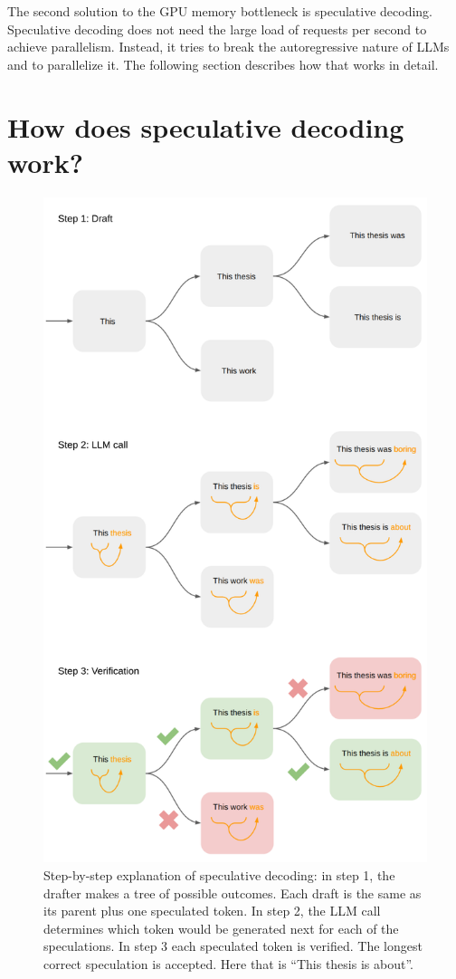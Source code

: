 The second solution to the GPU memory bottleneck is speculative decoding. Speculative decoding does not need the large load of requests per second to achieve parallelism. Instead, it tries to break the autoregressive nature of LLMs and to parallelize it. The following section describes how that works in detail.

\section{How does speculative decoding work?}

\begin{figure}[H]
	\centering
	\includegraphics[width=0.75\linewidth]{fig/spec_dec_three_step_plan.png}
	\caption{Step-by-step explanation of speculative decoding: in step 1, the drafter makes a tree of possible outcomes. Each draft is the same as its parent plus one speculated token. In step 2, the LLM call determines which token would be generated next for each of the speculations. In step 3 each speculated token is verified. The longest correct speculation is accepted. Here that is ``This thesis is about''.}
	\label{fig:spec_dec_three_step_plan}
\end{figure}

